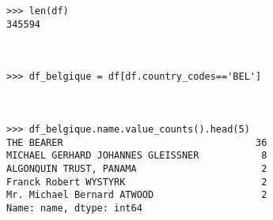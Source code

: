 \begin{question}[2 pts]
\begin{mybox}
\begin{reponse}
\begin{verbatim}
>>> len(df)
345594



>>> df_belgique = df[df.country_codes=='BEL']



>>> df_belgique.name.value_counts().head(5)
THE BEARER                                  36
MICHAEL GERHARD JOHANNES GLEISSNER           8
ALGONQUIN TRUST, PANAMA                      2
Franck Robert WYSTYRK                        2
Mr. Michael Bernard ATWOOD                   2
Name: name, dtype: int64
\end{verbatim}
\end{reponse}
\end{mybox}
\end{question}






